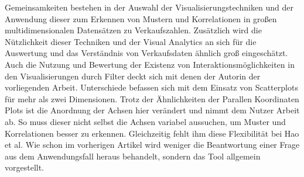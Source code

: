 \documentclass[usegeometry=true]{scrartcl}
\begin{document}
Gemeinsamkeiten bestehen in der Auswahl der Visualisierungstechniken und der Anwendung dieser zum Erkennen von Mustern und Korrelationen in großen multidimensionalen Datensätzen zu Verkaufszahlen.
Zusätzlich wird die Nützlichkeit dieser Techniken und der Visual Analytics an sich für die Auswertung und das Verständnis von Verkaufsdaten ähnlich groß eingeschätzt.
Auch die Nutzung und Bewertung der Existenz von Interaktionsmöglichkeiten in den Visualisierungen durch Filter deckt sich mit denen der Autorin der vorliegenden Arbeit.
Unterschiede befassen sich mit dem Einsatz von Scatterplots für mehr als zwei Dimensionen.
Trotz der Ähnlichkeiten der Parallen Koordinaten Plots ist die Anordnung der Achsen hier verändert und nimmt dem Nutzer Arbeit ab. 
So muss dieser nicht selbst die Achsen variabel aussuchen, um Muster und Korrelationen besser zu erkennen. 
Gleichzeitig fehlt ihm diese Flexibilität bei Hao et al.
Wie schon im vorherigen Artikel wird weniger die Beantwortung einer Frage aus dem Anwendungsfall heraus behandelt, sondern das Tool allgemein vorgestellt.

\end{document}
